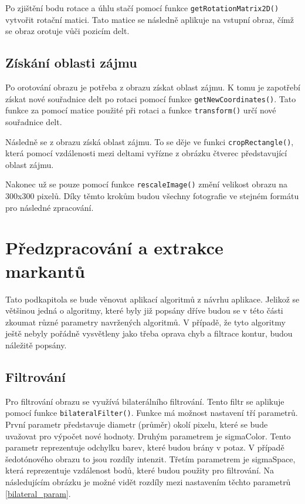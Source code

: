 Po zjištění bodu rotace a úhlu stačí pomocí funkce \texttt{getRotationMatrix2D()} vytvořit rotační matici. Tato matice se následně aplikuje na vstupní obraz, čímž se obraz orotuje vůči pozicím delt. 

\subsection{Získání oblasti zájmu}

Po orotování obrazu je potřeba z obrazu získat oblast zájmu. K tomu je zapotřebí získat nové souřadnice delt po rotaci pomocí funkce \texttt{getNewCoordinates()}. Tato funkce za pomocí matice použité při rotaci a funkce \texttt{transform()} určí nové souřadnice delt. 

Následně se z obrazu získá oblast zájmu. To se děje ve funkci \texttt{cropRectangle()}, která pomocí vzdálenosti mezi deltami vyřízne z obrázku čtverec představující oblast zájmu.

Nakonec už se pouze pomocí funkce \texttt{rescaleImage()} změní velikost obrazu na 300x300 pixelů. Díky těmto krokům budou všechny fotografie ve stejném formátu pro následné zpracování.

\section{Předzpracování a extrakce markantů}
Tato podkapitola se bude věnovat aplikací algoritmů z návrhu aplikace. Jelikož se většinou jedná o algoritmy, které byly již popsány dříve budou se v této části zkoumat různé parametry navržených algoritmů. V případě, že tyto algoritmy ještě nebyly pořádně vysvětleny jako třeba oprava chyb a filtrace kontur, budou náležitě popsány.

\subsection{Filtrování}
Pro filtrování obrazu se využívá bilaterálního filtrování. Tento filtr se aplikuje pomocí funkce \texttt{bilateralFilter()}. Funkce má možnost nastavení tří parametrů. První parametr představuje diametr (průměr) okolí pixelu, které se bude uvažovat pro výpočet nové hodnoty. Druhým parametrem je sigmaColor. Tento parametr reprezentuje odchylku barev, které budou brány v potaz. V případě šedotónového obrazu to jsou rozdíly intenzit. Třetím parametrem je sigmaSpace, která reprezentuje vzdálenost bodů, které budou použity pro filtrování. Na následujícím obrázku je možné vidět rozdíly mezi nastavením těchto parametrů \ref{bilateral_param}.

